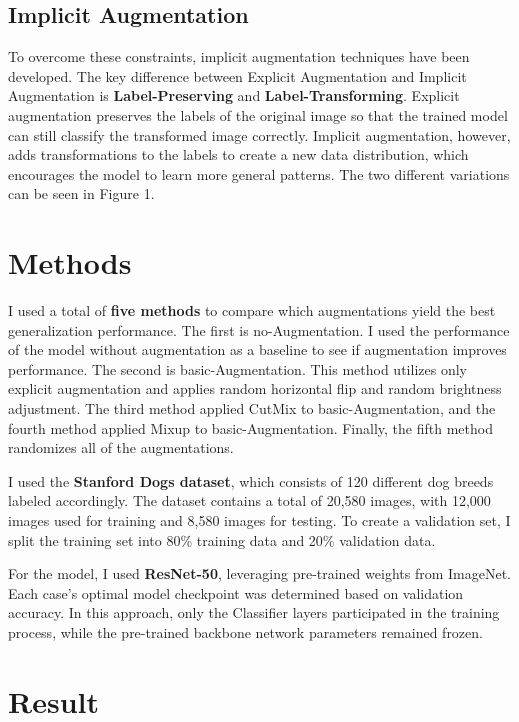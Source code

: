 \documentclass{article}
\begin{document}
\subsection{Implicit Augmentation}

To overcome these constraints, implicit augmentation techniques have been developed. The key difference between Explicit Augmentation and Implicit Augmentation is {\bf Label-Preserving} and {\bf Label-Transforming}. Explicit augmentation preserves the labels of the original image so that the trained model can still classify the transformed image correctly. Implicit augmentation, however, adds transformations to the labels to create a new data distribution, which encourages the model to learn more general patterns. The two different variations can be seen in Figure 1.


\section{Methods}
\label{gen_inst}


I used a total of {\bf five methods} to compare which augmentations yield the best generalization performance. The first is no-Augmentation. I used the performance of the model without augmentation as a baseline to see if augmentation improves performance. The second is basic-Augmentation. This method utilizes only explicit augmentation and applies random horizontal flip and random brightness adjustment. The third method applied CutMix to basic-Augmentation, and the fourth method applied Mixup to basic-Augmentation. Finally, the fifth method randomizes all of the augmentations.

I used the {\bf Stanford Dogs dataset}, which consists of 120 different dog breeds labeled accordingly. The dataset contains a total of 20,580 images, with 12,000 images used for training and 8,580 images for testing. To create a validation set, I split the training set into 80\% training data and 20\% validation data.

For the model, I used {\bf ResNet-50}, leveraging pre-trained weights from ImageNet. Each case's optimal model checkpoint was determined based on validation accuracy. In this approach, only the Classifier layers participated in the training process, while the pre-trained backbone network parameters remained frozen.


\section{Result}
\label{headings}
\end{document}
